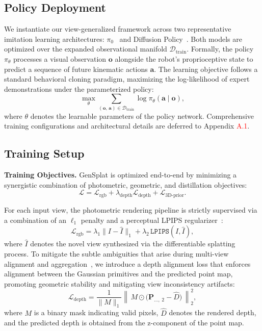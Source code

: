 \subsection{Policy Deployment}
\label{Policy Deployment}
We instantiate our view-generalized framework across two representative imitation learning architectures: $\pi_0$~\cite{black2410pi0} and Diffusion Policy~\cite{chi2023diffusion}. Both models are optimized over the expanded observational manifold $\mathcal{D}_{\text{train}}$. Formally, the policy $\pi_\theta$ processes a visual observation $\boldsymbol{o}$ alongside the robot's proprioceptive state to predict a sequence of future kinematic actions $\boldsymbol{a}$. The learning objective follows a standard behavioral cloning paradigm, maximizing the log-likelihood of expert demonstrations under the parameterized policy:
\begin{equation}
    \max_{\theta}\sum_{(\boldsymbol{o},\,\boldsymbol{a}) \in \mathcal{D}_{\text{train}}} \log \pi_{\theta}(\boldsymbol{a}\mid \boldsymbol{o}),
\end{equation}
where $\theta$ denotes the learnable parameters of the policy network. Comprehensive training configurations and architectural details are deferred to Appendix \textcolor{red}{A.1}.


\subsection{Training Setup}
\label{Training Setup}
\textbf{Training Objectives.}
GenSplat is optimized end-to-end by minimizing a synergistic combination of photometric, geometric, and distillation objectives:
\begin{equation}
\mathcal{L} = \mathcal{L}_{\text{rgb}} + \lambda_{\text{depth}} \mathcal{L}_{\text{depth}} + \mathcal{L}_{\text{3D-prior}}.
\label{eq:total_loss}
\end{equation}

For each input view, the photometric rendering pipeline is strictly supervised via a combination of an $\ell_1$ penalty and a perceptual LPIPS regularizer~\cite{zhang2018unreasonable}:
\begin{equation}
\mathcal{L}_{\text{rgb}} = \lambda_{\text{1}}\| I - \hat{I} \|_1 + \lambda_{\text{2}} \, \mathtt{LPIPS}(I,\hat{I}),
\label{eq:rgb_loss}
\end{equation}
where $\hat{I}$ denotes the novel view synthesized via the differentiable splatting process.
To mitigate the subtle ambiguities that arise during multi-view alignment and aggregation~\cite{jiang2025anysplat}, we introduce a depth alignment loss that enforces alignment between the Gaussian primitives and the predicted point map, promoting geometric stability and mitigating view inconsistency artifacts:
\begin{equation}
\mathcal{L}_{\text{depth}}
= \frac{1}{\lVert M \rVert_{1}}
\left\lVert\, M \odot \big( \boldsymbol{P}_{...,\;2} - \hat{D} \big) \,\right\rVert_{2}^{2},
\end{equation}
where \(M\) is a binary mask indicating valid pixels, \(\hat{D}\) denotes the rendered depth, and the predicted depth is obtained from the z-component of the point map.


